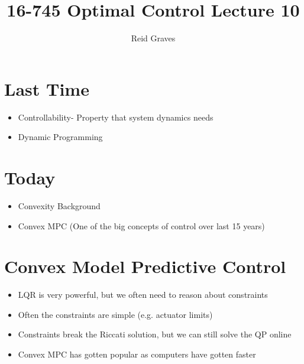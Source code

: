 \documentclass[11pt]{article}
\title{16-745 Optimal Control Lecture 10}
\author{Reid Graves}
\begin{document}
\maketitle
\section{Last Time}
\begin{itemize}
    \item Controllability- Property that system dynamics needs
    \item Dynamic Programming
\end{itemize}

\section{Today}
\begin{itemize}
    \item Convexity Background
    \item Convex MPC (One of the big concepts of control over last 15 years)
\end{itemize}
\section{Convex Model Predictive Control}
\begin{itemize}
    \item LQR is very powerful, but we often need to reason about constraints
    \item Often the constraints are simple (e.g. actuator limits)
    \item Constraints break the Riccati solution, but we can still solve the QP online
    \item Convex MPC has gotten popular as computers have gotten faster
\end{itemize}
\end{document}
